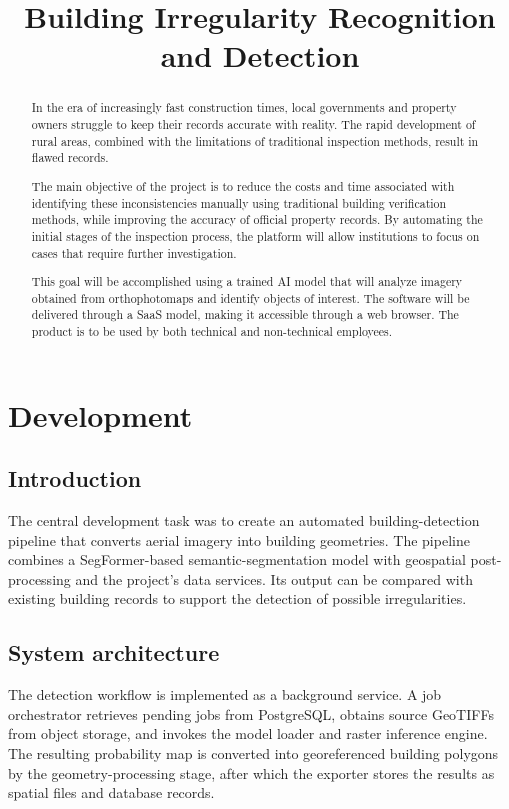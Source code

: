 \documentclass[english,edition=2026]{zpiday}
\title{Building Irregularity Recognition and Detection}
\begin{document}
\maketitle

\begin{abstract}
In the era of increasingly fast construction times, local governments and property owners struggle to keep their records accurate with reality. The rapid development of rural areas, combined with the limitations of traditional inspection methods, result in flawed records.\par
The main objective of the project is to reduce the costs and time associated with identifying these inconsistencies manually using traditional building verification methods, while improving the accuracy of official property records. By automating the initial stages of the inspection process, the platform will allow institutions to focus on cases that require further investigation.\par
This goal will be accomplished using a trained AI model that will analyze imagery obtained from orthophotomaps and identify objects of interest. The software will be delivered through a SaaS model, making it accessible through a web browser. The product is to be used by both technical and non-technical employees.\par


\end{abstract}


\section{Development}

\subsection{Introduction}
The central development task was to create an automated building-detection
pipeline that converts aerial imagery into building geometries. The pipeline
combines a SegFormer-based semantic-segmentation model with geospatial
post-processing and the project's data services. Its output can be compared
with existing building records to support the detection of possible
irregularities.

\subsection{System architecture}
The detection workflow is implemented as a background service. A job
orchestrator retrieves pending jobs from PostgreSQL, obtains source GeoTIFFs
from object storage, and invokes the model loader and raster inference engine.
The resulting probability map is converted into georeferenced building
polygons by the geometry-processing stage, after which the exporter stores the
results as spatial files and database records.
\end{document}

